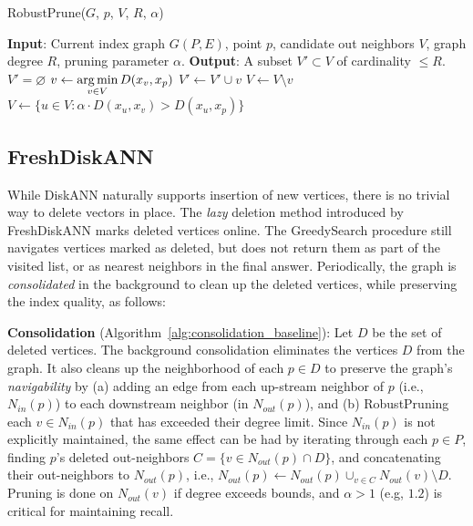 \begin{algorithm}
\caption{RobustPrune($G$, $p$, $V$, $R$, $\alpha$)}
\label{alg:pruning}
\begin{algorithmic}[1]
\State \textbf{Input}: Current index graph $G(P,E)$, point $p$, 
candidate out neighbors $V$, graph degree $R$, pruning parameter $\alpha$.
\State \textbf{Output}: A subset $V'\subset V$ of cardinality $\leq R$.
\State $V'=\varnothing$
\State $v\gets \operatorname*{arg\,min}\limits_{v\in V}D(x_v,x_p)$
\State $V'\gets V'\cup v$
\State $V\gets V \setminus v$
\State $V\gets \{u\in V: \alpha\cdot D(x_u,x_v) > D(x_u,x_p)\}$
\EndWhile

\end{algorithmic}
\end{algorithm}

\subsection{FreshDiskANN}

While DiskANN naturally supports insertion of new vertices, there is no trivial way to delete vectors in place.
The \emph{lazy} deletion method introduced by FreshDiskANN \cite{freshdiskann} marks deleted
vertices online. The \textsf{GreedySearch} procedure still navigates vertices marked as deleted,
but does not return them as part of the visited list, or as nearest neighbors in the final answer. 
Periodically, the graph is \emph{consolidated} in the background to clean up the deleted vertices,
while preserving the index quality, as follows:

\textsf{{\bf Consolidation} (Algorithm~\ref{alg:consolidation_baseline}):}
Let $D$ be the set of deleted vertices. The background consolidation eliminates the vertices $D$
from the graph. It also cleans up the  neighborhood of each $p\in D$ to preserve the graph's \emph{navigability}
by (a) adding an edge from each up-stream neighbor of $p$ (i.e., $N_{in}(p)$) to each downstream neighbor (in $N_{out}(p)$),
and (b) RobustPruning each $v\in N_{in}(p)$ that has exceeded their degree limit.
Since  $N_{in}(p)$ is not explicitly maintained, the same effect can be had by
iterating through each $p\in P$, finding $p$'s deleted out-neighbors
$C = \{v\in N_{out}(p) \cap D\}$, and concatenating their out-neighbors  to $N_{out}(p)$, i.e.,
$N_{out}(p) \gets N_{out}(p) \cup_{v\in C} N_{out}(v) \setminus D$.
Pruning is done on $N_{out}(v)$ if degree exceeds bounds,
and $\alpha>1$ (e.g, $1.2$) is critical for maintaining recall.

